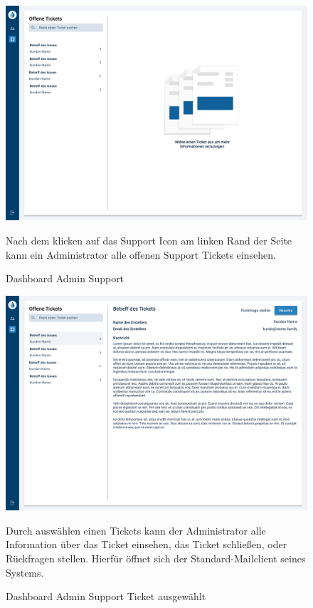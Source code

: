 \newpage

\begin{figure}[h]
	\centering
    \includegraphics[scale=0.3]{img/WebsiteMockup/Dashboard-Admin-Support}
	\caption{Dashboard Admin Support} \hfill \break
	Nach dem klicken auf das Support Icon am linken Rand der Seite kann ein Administrator alle offenen Support Tickets einsehen.
\end{figure}

\newpage

\begin{figure}[h]
	\centering
    \includegraphics[scale=0.3]{img/WebsiteMockup/Dashboard-Admin-Support-Selected}
	\caption{Dashboard Admin Support Ticket ausgewählt} \hfill \break
	Durch auswählen einen Tickets kann der Administrator alle Information über das Ticket einsehen, das Ticket schließen, oder Rückfragen stellen. Hierfür öffnet sich der Standard-Mailclient seines Systems.
\end{figure}

